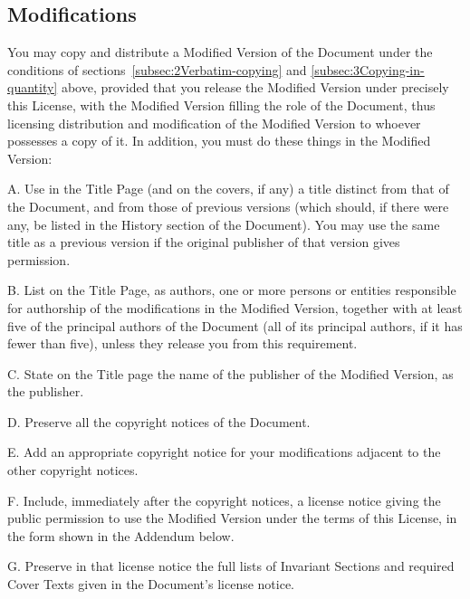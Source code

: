 \subsection{Modifications\label{subsec:4Modifications}}

{\tiny{}You may copy and distribute a Modified Version of the Document
under the conditions of sections~\ref{subsec:2Verbatim-copying}
and \ref{subsec:3Copying-in-quantity} above, provided that you release
the Modified Version under precisely this License, with the Modified
Version filling the role of the Document, thus licensing distribution
and modification of the Modified Version to whoever possesses a copy
of it. In addition, you must do these things in the Modified Version:}{\tiny\par}

{\tiny{}A. Use in the Title Page (and on the covers, if any) a title
distinct from that of the Document, and from those of previous versions
(which should, if there were any, be listed in the History section
of the Document). You may use the same title as a previous version
if the original publisher of that version gives permission.}{\tiny\par}

{\tiny{}B. List on the Title Page, as authors, one or more persons
or entities responsible for authorship of the modifications in the
Modified Version, together with at least five of the principal authors
of the Document (all of its principal authors, if it has fewer than
five), unless they release you from this requirement.}{\tiny\par}

{\tiny{}C. State on the Title page the name of the publisher of the
Modified Version, as the publisher.}{\tiny\par}

{\tiny{}D. Preserve all the copyright notices of the Document.}{\tiny\par}

{\tiny{}E. Add an appropriate copyright notice for your modifications
adjacent to the other copyright notices.}{\tiny\par}

{\tiny{}F. Include, immediately after the copyright notices, a license
notice giving the public permission to use the Modified Version under
the terms of this License, in the form shown in the Addendum below.}{\tiny\par}

{\tiny{}G. Preserve in that license notice the full lists of Invariant
Sections and required Cover Texts given in the Document\textsf{'}s license
notice.}{\tiny\par}

